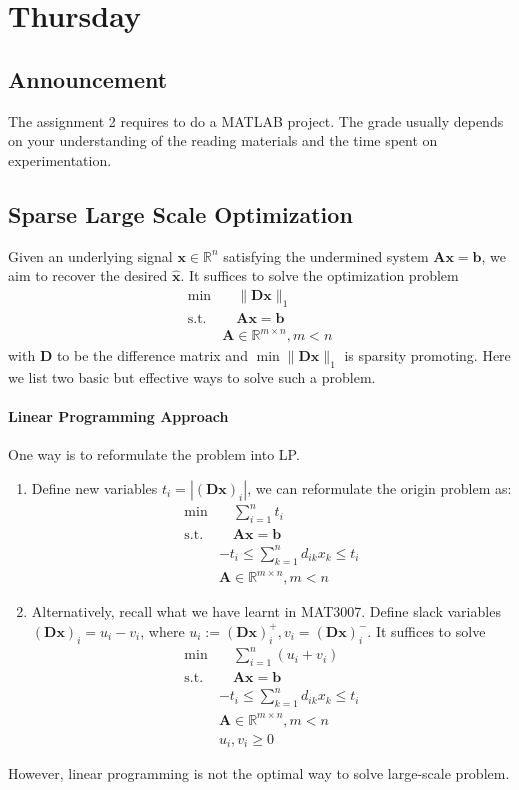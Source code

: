 
\section{Thursday}
\subsection{Announcement}
The assignment 2 requires to do a MATLAB project. The grade usually depends on your understanding of the reading materials and the time spent on experimentation.
\subsection{Sparse Large Scale Optimization}
Given an underlying signal $\bm x\in\mathbb{R}^n$ satisfying the undermined system $\bm{Ax}=\bm b$, we aim to recover the desired $\bm{\hat x}$. It suffices to solve the optimization problem
\[
\begin{array}{ll}
\min&\quad \|\bm D\bm x\|_1\\
\mbox{s.t.}&\quad\bm{Ax}= \bm b\\
&\bm A\in\mathbb{R}^{m\times n},m<n
\end{array}
\]
with $\bm D$ to be the difference matrix and $\min\|\bm{Dx}\|_1$ is sparsity promoting. Here we list two basic but effective ways to solve such a problem.

\paragraph{Linear Programming Approach}One way is to reformulate the problem into LP.
\begin{enumerate}
\item
Define new variables $t_i = |(\bm{Dx})_i|$, we can reformulate the origin problem as:
\[
\begin{array}{ll}
\min&\quad \sum_{i=1}^nt_i\\
\mbox{s.t.}&\quad\bm{Ax}= \bm b\\
&-t_i\le \sum_{k=1}^nd_{ik}x_k\le t_i\\
&\bm A\in\mathbb{R}^{m\times n},m<n
\end{array}
\]
\item
Alternatively, recall what we have learnt in MAT3007. Define slack variables $(\bm{Dx})_i = u_i -v_i $, where $u_i:=(\bm{Dx})_i^+, v_i =(\bm{Dx})_i^-$. It suffices to solve 
\[
\begin{array}{ll}
\min&\quad \sum_{i=1}^n(u_i+v_i)\\
\mbox{s.t.}&\quad\bm{Ax}= \bm b\\
&-t_i\le \sum_{k=1}^nd_{ik}x_k\le t_i\\
&\bm A\in\mathbb{R}^{m\times n},m<n\\
&u_i,v_i\ge0
\end{array}
\]
\end{enumerate}
However, linear programming is not the optimal way to solve large-scale problem.

